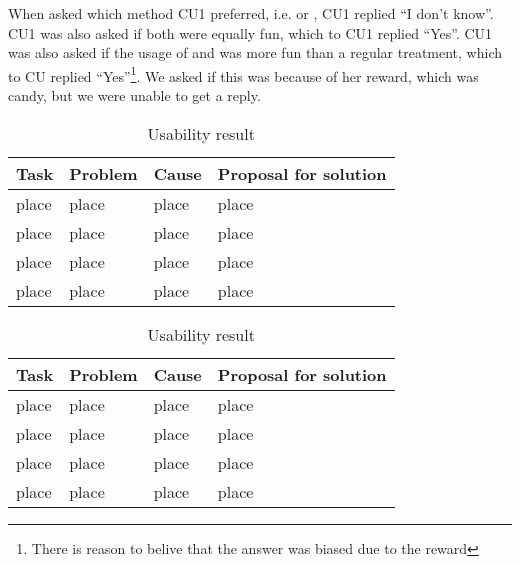 When asked which method CU1 preferred, i.e. \app{} or \ab{}, CU1 replied ``I don't know''. CU1 was also asked if both were equally fun, which to CU1 replied ``Yes''. CU1 was also asked if the usage of \app{} and \ab{} was more fun than a regular treatment, which to CU replied ``Yes''\footnote{There is reason to belive that the answer was biased due to the reward}. We asked if this was because of her reward, which was candy, but we were unable to get a reply. 

\begin{table}[H]
\begin{tabular}{| p{3.0cm} | p{3.0cm} | p{3.0cm} | p{3.0cm} |}
\hline
	\textbf{Task} & \textbf{Problem} & \textbf{Cause} & \textbf{Proposal for solution} \\
	\hline
	place & place & place & place \\
	\hline
	place & place & place & place \\
	\hline
	place & place & place & place \\
	\hline
	place & place & place & place \\
	\hline
	
\end{tabular}
\label{tab:test1}
\caption{Usability result}
\end{table}

\begin{table}[H]
\begin{tabular}{| p{3.0cm} | p{3.0cm} | p{3.0cm} | p{3.0cm} |}
\hline
	\textbf{Task} & \textbf{Problem} & \textbf{Cause} & \textbf{Proposal for solution} \\
	\hline
	place & place & place & place \\
	\hline
	place & place & place & place \\
	\hline
	place & place & place & place \\
	\hline
	place & place & place & place \\
	\hline
	
\end{tabular}
\label{tab:test1}
\caption{Usability result}
\end{table}